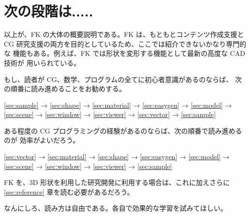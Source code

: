 \section{次の段階は.....}
以上が、FK の大体の概要説明である。FK は、もともとコンテンツ作成支援と
CG 研究支援の両方を目的としているため、ここでは紹介できないかなり専門的な
機能もある。例えば、FK では形状を変形する機能として最新の高度な CAD 技術が
用いられている。

もし、読者が CG、数学、プログラムの全てに初心者意識があるのならば、
次の順番に読み進めることをお勧めする。
\begin{center}
\ref{sec:sample} → \ref{sec:shape} → \ref{sec:material} →
\ref{sec:easygen} →
\ref{sec:model} → \ref{sec:scene} → \ref{sec:window} →
\ref{sec:viewer} → \ref{sec:vector} → \ref{sec:sample} 
\end{center}
ある程度の CG プログラミングの経験があるのならば、次の順番で読み進めるのが
効率がよいだろう。
\begin{center}
\ref{sec:vector} → \ref{sec:material} → \ref{sec:shape} →
\ref{sec:easygen} →
\ref{sec:model} → \ref{sec:scene} → \ref{sec:window} →
\ref{sec:viewer} → \ref{sec:sample}
\end{center}
FK を、3D 形状を利用した研究開発に利用する場合は、これに加えさらに
\ref{sec:reference} 章を読む必要があるだろう。

なんにしろ、読み方は自由である。各自で効果的な学習を試みてほしい。
